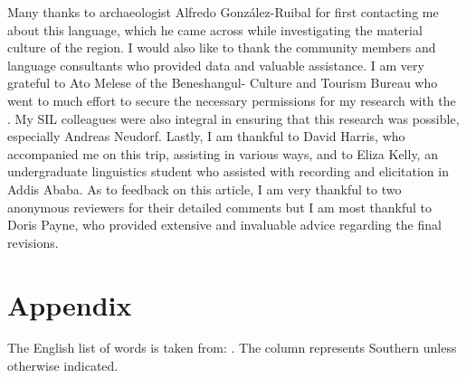 \documentclass[output=paper]{langsci/langscibook}
\begin{document}
Many thanks to archaeologist Alfredo González-Ruibal for first contacting me about this language, which he came across while investigating the material culture of the region. I would also like to thank the  community members and language consultants who provided data and valuable assistance. I am very grateful to Ato Melese of the Beneshangul- Culture and Tourism Bureau who went to much effort to secure the necessary permissions for my research with the . My SIL colleagues were also integral in ensuring that this research was possible, especially Andreas Neudorf. Lastly, I am thankful to David Harris, who accompanied me on this trip, assisting in various ways, and to Eliza Kelly, an undergraduate linguistics student who assisted with recording and elicitation in Addis Ababa. As to feedback on this article, I am very thankful to two anonymous reviewers for their detailed comments but I am most thankful to Doris Payne, who provided extensive and invaluable advice regarding the final revisions.

\section*{Appendix}

The English list of words is taken from: \citet{HaspelmathTadmor2009}. The  column represents Southern  unless otherwise indicated.
\end{document}
